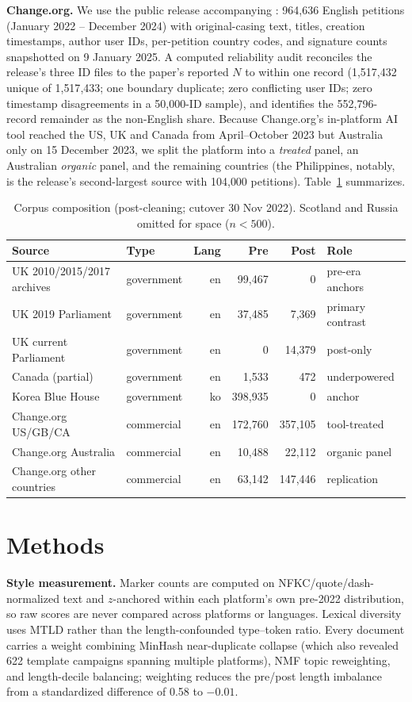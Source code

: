 \documentclass[10pt,twocolumn]{article}
\begin{document}
\textbf{Change.org.} We use the public release accompanying \cite{corpus2026introducing}: 964{,}636 English petitions (January 2022 -- December 2024) with original-casing text, titles, creation timestamps, author user IDs, per-petition country codes, and signature counts snapshotted on 9 January 2025. A computed reliability audit reconciles the release's three ID files to the paper's reported $N$ to within one record (1{,}517{,}432 unique of 1{,}517{,}433; one boundary duplicate; zero conflicting user IDs; zero timestamp disagreements in a 50{,}000-ID sample), and identifies the 552{,}796-record remainder as the non-English share. Because Change.org's in-platform AI tool reached the US, UK and Canada from April--October 2023 but Australia only on 15 December 2023, we split the platform into a \emph{treated} panel, an Australian \emph{organic} panel, and the remaining countries (the Philippines, notably, is the release's second-largest source with 104{,}000 petitions). Table~\ref{tab:corpus} summarizes.

\begin{table}[t]\centering\small
\caption{Corpus composition (post-cleaning; cutover 30 Nov 2022). Scotland and Russia omitted for space ($n<500$).}
\label{tab:corpus}
\begin{tabular}{llrrrl}
\toprule
Source & Type & Lang & Pre & Post & Role\\
\midrule
UK 2010/2015/2017 archives & government & en & 99{,}467 & 0 & pre-era anchors\\
UK 2019 Parliament & government & en & 37{,}485 & 7{,}369 & primary contrast\\
UK current Parliament & government & en & 0 & 14{,}379 & post-only\\
Canada (partial) & government & en & 1{,}533 & 472 & underpowered\\
Korea Blue House & government & ko & 398{,}935 & 0 & anchor\\
Change.org US/GB/CA & commercial & en & 172{,}760 & 357{,}105 & tool-treated\\
Change.org Australia & commercial & en & 10{,}488 & 22{,}112 & organic panel\\
Change.org other countries & commercial & en & 63{,}142 & 147{,}446 & replication\\
\bottomrule
\end{tabular}
\end{table}

\section{Methods}
\textbf{Style measurement.} Marker counts are computed on NFKC/quote/dash-normalized text and $z$-anchored within each platform's own pre-2022 distribution, so raw scores are never compared across platforms or languages. Lexical diversity uses MTLD \cite{mccarthy2010mtld} rather than the length-confounded type--token ratio. Every document carries a weight combining MinHash near-duplicate collapse (which also revealed 622 template campaigns spanning multiple platforms), NMF topic reweighting, and length-decile balancing; weighting reduces the pre/post length imbalance from a standardized difference of 0.58 to $-0.01$.
\end{document}
